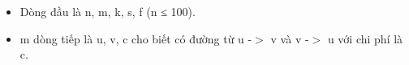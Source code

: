 \begin{itemize}
	\item Dòng đầu là n, m, k, s, f (n ≤ 100).
	\item m dòng tiếp là u, v, c cho biết có đường từ u -$>$ v và v -$>$ u với chi phí là c.
\end{itemize}